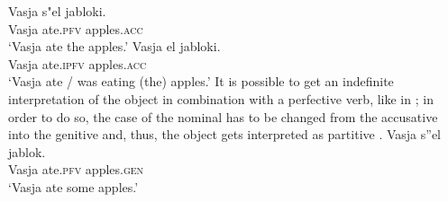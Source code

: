 \documentclass[output=paper]{langscibook}
\begin{document}
\ea \label{ex:seres:4}
\gll Vasja s"el		jabloki.\\
Vasja ate.\textsc{pfv}		apples.\textsc{acc}\\
\glt `Vasja ate the apples.'
\ex \label{ex:seres:5}
\gll	Vasja	el			jabloki.\\
Vasja ate.\textsc{ipfv}  apples.\textsc{acc}\\
\glt `Vasja ate / was eating (the) apples.'
\z
\noindent It is possible to get an indefinite interpretation of the object in combination with a perfective verb, like in ; in order to do so, the case of the nominal has to be changed from the accusative into the genitive and, thus, the object gets interpreted as partitive .   %
\ea \label{ex:seres:6}
\gll Vasja s''el		jablok.\\
Vasja	ate.\textsc{pfv}		apples.\textsc{gen}\\
\glt `Vasja ate some apples.'
\z
\noindent
\noindent
\end{document}
